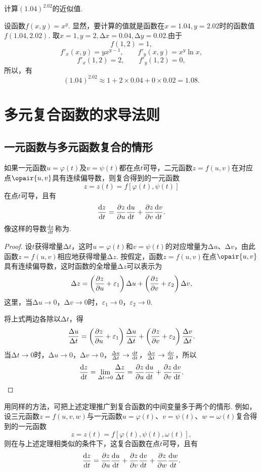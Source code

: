 \begin{example}
计算\((1.04)^{2.02}\)的近似值.
\begin{solution}
设函数\(f(x,y) = x^y\).
显然，要计算的值就是函数在\(x=1.04,y=2.02\)时的函数值\(f(1.04,2.02)\).
取\(x=1,y=2,\increment x=0.04,\increment y=0.02\).由于\[
f(1,2)=1,
\]\[
f'_x(x,y) = y x^{y-1}, \qquad f'_y(x,y) = x^y \ln x,
\]\[
f'_x(1,2) = 2, \qquad f'_y(1,2) = 0,
\]所以，有\[
(1.04)^{2.02} \approx 1 + 2 \times 0.04 + 0 \times 0.02 = 1.08.
\]
\end{solution}
\end{example}

\section{多元复合函数的求导法则}
\subsection{一元函数与多元函数复合的情形}
\begin{theorem}
如果一元函数\(u=\varphi(t)\)及\(v=\psi(t)\)都在点\(t\)可导，二元函数\(z=f(u,v)\)在对应点\(\opair{u,v}\)具有连续偏导数，则复合得到的一元函数\[
z = z(t) = f[\varphi(t),\psi(t)]
\]在点\(t\)可导，且有\[
\dv{z}{t} = \pdv{z}{u}\dv{u}{t} + \pdv{z}{v}\dv{v}{t}.
\]
像这样的导数\(\dv{z}{t}\)称为.
\begin{proof}
\def\D#1#2{\frac{\increment #1}{\increment #2}}
设\(t\)获得增量\(\increment t\)，这时\(u=\varphi(t)\)和\(v=\psi(t)\)的对应增量为\(\increment u\)、\(\increment v\)，由此函数\(z=f(u,v)\)相应地获得增量\(\increment z\).
按假定，函数\(z=f(u,v)\)在点\(\opair{u,v}\)具有连续偏导数，这时函数的全增量\(\increment z\)可以表示为
\[
\Delta z = \left(\pdv{z}{u} + \varepsilon_1\right) \Delta u + \left(\pdv{z}{v} + \varepsilon_2\right) \Delta v,
\]这里，当\(\increment u\to0\)，\(\increment v\to0\)时，\(\varepsilon_1\to0\)，\(\varepsilon_2\to0\).

将上式两边各除以\(\increment t\)，得\[
\D{u}{t} = \left(\pdv{z}{u} + \varepsilon_1\right) \D{u}{t} + \left(\pdv{z}{v} + \varepsilon_2\right) \D{v}{t}.
\]当\(\increment t\to0\)时，\(\increment u\to0\)，\(\increment v\to0\)，\(\D{u}{t} \to \dv{t}{t}\)，\(\D{v}{t} \to \dv{v}{t}\)，所以\[
\dv{z}{t} = \lim\limits_{\increment t\to0}{\D{z}{t}}
= \pdv{z}{u} \dv{u}{t} + \pdv{z}{v} \dv{v}{t}.
\qedhere
\]
\end{proof}
\end{theorem}
用同样的方法，可把上述定理推广到复合函数的中间变量多于两个的情形.
例如，设三元函数\(z=f(u,v,w)\)与一元函数\(u=\varphi(t)\)、\(v=\psi(t)\)、\(w=\omega(t)\)复合得到的一元函数\[
z = z(t) = f[\varphi(t),\psi(t),\omega(t)],
\]则在与上述定理相类似的条件下，这复合函数在点\(t\)可导，且有\[
\dv{z}{t} = \pdv{z}{u}\dv{u}{t} + \pdv{z}{v}\dv{v}{t} + \pdv{z}{w}\dv{w}{t}.
\]

